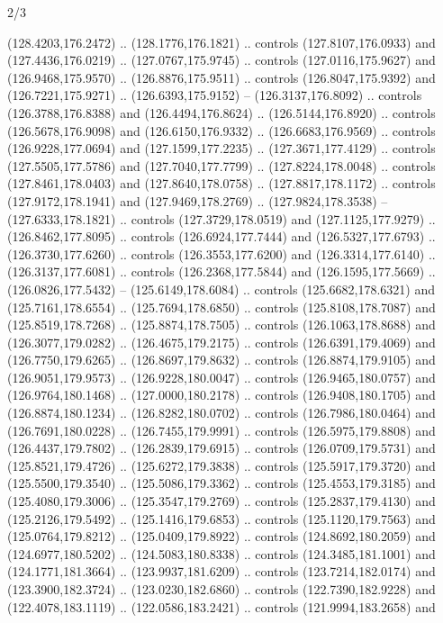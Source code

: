 \begin{flagdescription}{2/3}
\begin{scope}[shift={(0.5\flaglength,0.5)},scale=\flagwidth/320]
\begin{scope}[y=0.8pt, x=0.8pt, yscale=-1,shift={(-118.3,-146)}]
  (128.4203,176.2472) .. (128.1776,176.1821) .. controls (127.8107,176.0933) and
  (127.4436,176.0219) .. (127.0767,175.9745) .. controls (127.0116,175.9627) and
  (126.9468,175.9570) .. (126.8876,175.9511) .. controls (126.8047,175.9392) and
  (126.7221,175.9271) .. (126.6393,175.9152) -- (126.3137,176.8092) .. controls
  (126.3788,176.8388) and (126.4494,176.8624) .. (126.5144,176.8920) .. controls
  (126.5678,176.9098) and (126.6150,176.9332) .. (126.6683,176.9569) .. controls
  (126.9228,177.0694) and (127.1599,177.2235) .. (127.3671,177.4129) .. controls
  (127.5505,177.5786) and (127.7040,177.7799) .. (127.8224,178.0048) .. controls
  (127.8461,178.0403) and (127.8640,178.0758) .. (127.8817,178.1172) .. controls
  (127.9172,178.1941) and (127.9469,178.2769) .. (127.9824,178.3538) --
  (127.6333,178.1821) .. controls (127.3729,178.0519) and (127.1125,177.9279) ..
  (126.8462,177.8095) .. controls (126.6924,177.7444) and (126.5327,177.6793) ..
  (126.3730,177.6260) .. controls (126.3553,177.6200) and (126.3314,177.6140) ..
  (126.3137,177.6081) .. controls (126.2368,177.5844) and (126.1595,177.5669) ..
  (126.0826,177.5432) -- (125.6149,178.6084) .. controls (125.6682,178.6321) and
  (125.7161,178.6554) .. (125.7694,178.6850) .. controls (125.8108,178.7087) and
  (125.8519,178.7268) .. (125.8874,178.7505) .. controls (126.1063,178.8688) and
  (126.3077,179.0282) .. (126.4675,179.2175) .. controls (126.6391,179.4069) and
  (126.7750,179.6265) .. (126.8697,179.8632) .. controls (126.8874,179.9105) and
  (126.9051,179.9573) .. (126.9228,180.0047) .. controls (126.9465,180.0757) and
  (126.9764,180.1468) .. (127.0000,180.2178) .. controls (126.9408,180.1705) and
  (126.8874,180.1234) .. (126.8282,180.0702) .. controls (126.7986,180.0464) and
  (126.7691,180.0228) .. (126.7455,179.9991) .. controls (126.5975,179.8808) and
  (126.4437,179.7802) .. (126.2839,179.6915) .. controls (126.0709,179.5731) and
  (125.8521,179.4726) .. (125.6272,179.3838) .. controls (125.5917,179.3720) and
  (125.5500,179.3540) .. (125.5086,179.3362) .. controls (125.4553,179.3185) and
  (125.4080,179.3006) .. (125.3547,179.2769) .. controls (125.2837,179.4130) and
  (125.2126,179.5492) .. (125.1416,179.6853) .. controls (125.1120,179.7563) and
  (125.0764,179.8212) .. (125.0409,179.8922) .. controls (124.8692,180.2059) and
  (124.6977,180.5202) .. (124.5083,180.8338) .. controls (124.3485,181.1001) and
  (124.1771,181.3664) .. (123.9937,181.6209) .. controls (123.7214,182.0174) and
  (123.3900,182.3724) .. (123.0230,182.6860) .. controls (122.7390,182.9228) and
  (122.4078,183.1119) .. (122.0586,183.2421) .. controls (121.9994,183.2658) and

\end{scope}
\end{scope}
\end{flagdescription}
